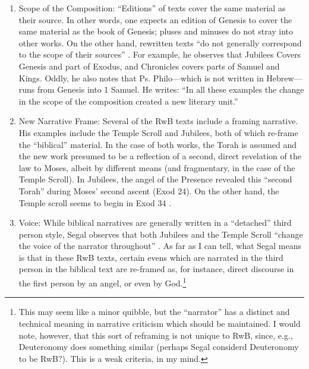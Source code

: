 \begin{enumerate}
\def\labelenumi{\arabic{enumi}.}
\item
  Scope of the Composition: ``Editions'' of texts cover the same
  material as their source. In other words, one expects an edition of
  Genesis to cover the same material as the book of Genesis; pluses and
  minuses do not stray into other works. On the other hand, rewritten
  texts ``do not generally correspond to the scope of their sources''
  \autocite[20]{segal_henze2005}. For example, he observes that Jubilees
  Covers Genesis and part of Exodus, and Chronicles covers parts of
  Samuel and Kings. Oddly, he also notes that Ps. Philo---which is not
  written in Hebrew---runs from Genesis into 1 Samuel. He writes: ``In
  all these examples the change in the scope of the composition created
  a new literary unit.'' \autocite[20--21]{segal_henze2005}
\item
  New Narrative Frame: Several of the RwB texts include a framing
  narrative. His examples include the Temple Scroll and Jubilees, both
  of which re-frame the ``biblical'' material. In the case of both
  works, the Torah is assumed and the new work presumed to be a
  reflection of a second, direct revelation of the law to Moses, albeit
  by different means (and fragmentary, in the case of the Temple
  Scroll). In Jubilees, the angel of the Presence revealed this ``second
  Torah'' during Moses' second ascent (Exod 24). On the other hand, the
  Temple scroll seems to begin in Exod 34
  \autocite[22]{segal_henze2005}.
\item
  Voice: While biblical narratives are generally written in a
  ``detached'' third person style, Segal observes that both Jubilees and
  the Temple Scroll ``change the voice of the narrator throughout''
  \autocite[22]{segal_henze2005}. As far as I can tell, what Segal means
  is that in these RwB texts, certain evens which are narrated in the
  third person in the biblical text are re-framed as, for instance,
  direct discourse in the first person by an angel, or even by
  God.\footnote{This may seem like a minor quibble, but the ``narrator''
    has a distinct and technical meaning in narrative criticism which
    should be maintained. I would note, however, that this sort of
    reframing is not unique to RwB, since, e.g., Deuteronomy does
    something similar (perhaps Segal considerd Deuteronomy to be RwB?).
    This is a weak criteria, in my mind.}
\end{enumerate}

